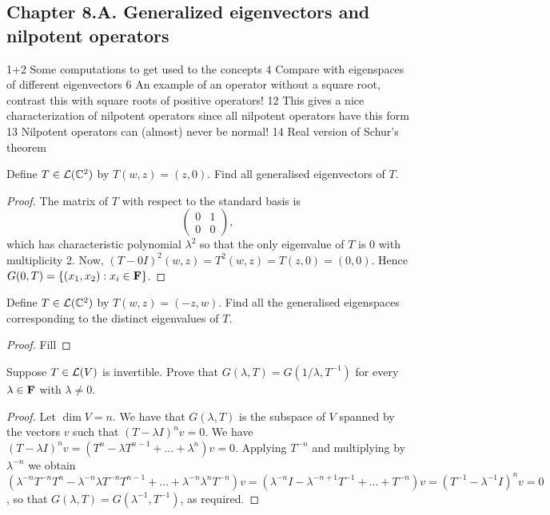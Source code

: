 \subsection*{Chapter 8.A. Generalized eigenvectors and nilpotent operators}

1+2 Some computations to get used to the concepts
4 Compare with eigenspaces of different eigenvectors
6 An example of an operator without a square root, contrast this with square roots of positive operators!
12 This gives a nice characterization of nilpotent operators since all nilpotent operators have this form 
13 Nilpotent operators can (almost) never be normal! 
14 Real version of Schur's theorem

\begin{exercise}{1}
  Define $T\in\mathcal{L}(\mathbb{C}^2)$ by $T(w,z)=(z,0)$. Find all generalised eigenvectors of $T$.
\end{exercise}
\begin{proof}
 The matrix of $T$ with respect to the standard basis is
 \[
 \begin{pmatrix}
     0 & 1\\
     0 & 0
 \end{pmatrix},
 \]
 which has characteristic polynomial $\lambda^2$ so that the only eigenvalue of $T$ is 0 with multiplicity 2. Now, $(T-0I)^2(w,z) =T^2(w,z) =T(z,0) =(0,0)$. Hence $G(0,T)=\{(x_1,x_2):x_i\in \mathbf{F}\}$.
\end{proof}

\begin{exercise}{2}
  Define $T\in\mathcal{L}(\mathbb{C}^2)$ by $T(w,z)=(-z,w)$. Find all the generalised eigenspaces corresponding to the distinct eigenvalues of $T$.
\end{exercise}
\begin{proof}
 Fill
\end{proof}

\begin{exercise}{3}
  Suppose $T\in\mathcal{L}(V)$ is invertible. Prove that $G(\lambda,T)=G(1/\lambda, T^{-1})$ for every $\lambda\in\mathbf{F}$ with $\lambda\neq 0$.
\end{exercise}
\begin{proof}
 Let $\dim V =n$. We have that $G(\lambda, T)$ is the subspace of $V$ spanned by the vectors $v$ such that $(T-\lambda I)^n v =0$. We have $(T-\lambda I)^n v=(T^n -\lambda T^{n-1}+\dots +\lambda^n)v =0$. Applying $T^{-n}$ and multiplying by $\lambda^{-n}$ we obtain $(\lambda^{-n}T^{-n}T^n -\lambda^{-n}\lambda T^{-n}T^{n-1}+\dots +\lambda^{-n}\lambda^nT^{-n})v =(\lambda^{-n}I -\lambda^{-n+1} T^{-1}+\dots + T^{-n})v =(T^{-1}-\lambda^{-1} I)^n v=0$, so that $G(\lambda, T)=G(\lambda^{-1}, T^{-1})$, as required.
\end{proof}


